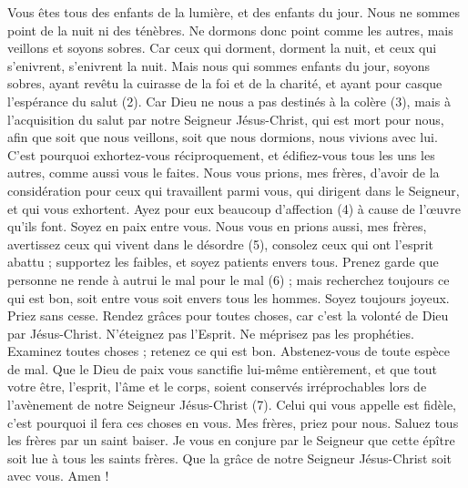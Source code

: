 \begin{multicols}{2}
Vous êtes tous des enfants de la lumière, et des enfants du jour. Nous ne sommes point de la nuit ni des ténèbres.
Ne dormons donc point comme les autres, mais veillons et soyons sobres.
Car ceux qui dorment, dorment la nuit, et ceux qui s'enivrent, s'enivrent la nuit.
Mais nous qui sommes enfants du jour, soyons sobres, ayant revêtu la cuirasse de la foi et de la charité, et ayant pour casque l'espérance du salut (2).
Car Dieu ne nous a pas destinés à la colère (3), mais à l'acquisition du salut par notre Seigneur Jésus-Christ,
qui est mort pour nous, afin que soit que nous veillons, soit que nous dormions, nous vivions avec lui.
C'est pourquoi exhortez-vous réciproquement, et édifiez-vous tous les uns les autres, comme aussi vous le faites.
Nous vous prions, mes frères, d’avoir de la considération pour ceux qui travaillent parmi vous, qui dirigent dans le Seigneur, et qui vous exhortent.
Ayez pour eux beaucoup d’affection (4) à cause de l’œuvre qu'ils font. Soyez en paix entre vous.
Nous vous en prions aussi, mes frères, avertissez ceux qui vivent dans le désordre (5), consolez ceux qui ont l'esprit abattu ; supportez les faibles, et soyez patients envers tous.
Prenez garde que personne ne rende à autrui le mal pour le mal (6) ; mais recherchez toujours ce qui est bon, soit entre vous soit envers tous les hommes.
Soyez toujours joyeux.
Priez sans cesse.
Rendez grâces pour toutes choses, car c'est la volonté de Dieu par Jésus-Christ.
N'éteignez pas l'Esprit.
Ne méprisez pas les prophéties.
Examinez toutes choses ; retenez ce qui est bon.
Abstenez-vous de toute espèce de mal.
Que le Dieu de paix vous sanctifie lui-même entièrement, et que tout votre être, l’esprit, l'âme et le corps, soient conservés irréprochables lors de l’avènement de notre Seigneur Jésus-Christ (7).
Celui qui vous appelle est fidèle, c'est pourquoi il fera ces choses en vous.
Mes frères, priez pour nous.
Saluez tous les frères par un saint baiser.
Je vous en conjure par le Seigneur que cette épître soit lue à tous les saints frères.
Que la grâce de notre Seigneur Jésus-Christ soit avec vous. Amen !
\PPE{}
\end{multicols}
